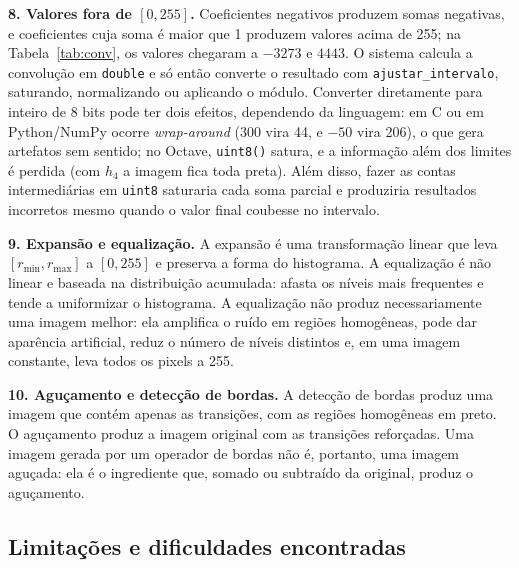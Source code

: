 \documentclass[11pt,a4paper]{article}
\begin{document}
\textbf{8. Valores fora de $[0,255]$.} Coeficientes negativos produzem somas negativas, e coeficientes cuja soma é maior que 1 produzem valores acima de 255; na Tabela~\ref{tab:conv}, os valores chegaram a $-3273$ e $4443$. O sistema calcula a convolução em \texttt{double} e só então converte o resultado com \texttt{ajustar\_intervalo}, saturando, normalizando ou aplicando o módulo. Converter diretamente para inteiro de 8 bits pode ter dois efeitos, dependendo da linguagem: em C ou em Python/NumPy ocorre \emph{wrap-around} (300 vira 44, e $-50$ vira 206), o que gera artefatos sem sentido; no Octave, \texttt{uint8()} satura, e a informação além dos limites é perdida (com $h_4$ a imagem fica toda preta). Além disso, fazer as contas intermediárias em \texttt{uint8} saturaria cada soma parcial e produziria resultados incorretos mesmo quando o valor final coubesse no intervalo.

\textbf{9. Expansão e equalização.} A expansão é uma transformação linear que leva $[r_{\min},r_{\max}]$ a $[0,255]$ e preserva a forma do histograma. A equalização é não linear e baseada na distribuição acumulada: afasta os níveis mais frequentes e tende a uniformizar o histograma. A equalização não produz necessariamente uma imagem melhor: ela amplifica o ruído em regiões homogêneas, pode dar aparência artificial, reduz o número de níveis distintos e, em uma imagem constante, leva todos os pixels a 255.

\textbf{10. Aguçamento e detecção de bordas.} A detecção de bordas produz uma imagem que contém apenas as transições, com as regiões homogêneas em preto. O aguçamento produz a imagem original com as transições reforçadas. Uma imagem gerada por um operador de bordas não é, portanto, uma imagem aguçada: ela é o ingrediente que, somado ou subtraído da original, produz o aguçamento.

\subsection{Limitações e dificuldades encontradas}
\end{document}
